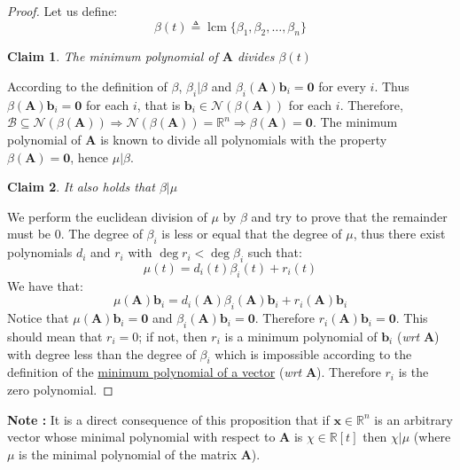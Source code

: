 \documentclass[a4paper,10pt,oneside]{book}
\newtheorem{claim}{Claim}
\begin{document}
\begin{proof}
 Let us define:
 \begin{equation}
  \beta(t)\triangleq\operatorname{lcm}\{\beta_1,\beta_2,\ldots,\beta_n\}
 \end{equation}
 \begin{claim}
  The minimum polynomial of $\mathbf{A}$ divides $\beta(t)$
 \end{claim}
 According to the definition of $\beta$, $\beta_i | \beta$ and $\beta_i(\mathbf{A})\mathbf{b}_i=\mathbf{0}$ for every $i$. Thus $\beta(\mathbf{A})\mathbf{b}_i=\mathbf{0}$ for each $i$, that is $\mathbf{b}_i\in\mathcal{N}(\beta(\mathbf{A}))$ for each $i$. Therefore, $\mathcal{B}\subseteq \mathcal{N}(\beta(\mathbf{A}))\Rightarrow\mathcal{N}(\beta(\mathbf{A}))=\mathbb{R}^n\Rightarrow\beta(\mathbf{A})=\mathbf{0}$. The minimum polynomial of $\mathbf{A}$ is known to divide all polynomials with the property $\beta(\mathbf{A})=\mathbf{0}$, hence $\mu|\beta$.
 \begin{claim}\label{claim:betaDividesMu}
  It also holds that $\beta|\mu$
 \end{claim}
 We perform the euclidean division of $\mu$ by $\beta$ and try to prove that the remainder must be 0. The degree of $\beta_i$ is less or equal that the degree of $\mu$, thus there exist polynomials $d_i$ and $r_i$ with $\operatorname{deg}r_i<\operatorname{deg}\beta_i$ such that:
 \begin{equation}
  \mu(t)=d_i(t)\beta_i(t)+r_i(t)
 \end{equation}
 We have that:
 \begin{equation}
  \mu(\mathbf{A})\mathbf{b}_i=d_i(\mathbf{A})\beta_i(\mathbf{A})\mathbf{b}_i+r_i(\mathbf{A})\mathbf{b}_i
 \end{equation}
 Notice that $\mu(\mathbf{A})\mathbf{b}_i=\mathbf{0}$ and $\beta_i(\mathbf{A})\mathbf{b}_i=\mathbf{0}$. Therefore $r_i(\mathbf{A})\mathbf{b}_i=\mathbf{0}$. This should mean that $r_i=0$; if not, then $r_i$ is a minimum polynomial of $\mathbf{b}_i$ (\textit{wrt} $\mathbf{A}$) with degree less than the degree of $\beta_i$ which is impossible according to the definition of the \hyperlink{def:mpOfVector}{minimum polynomial of a vector} (\textit{wrt} $\mathbf{A}$). Therefore $r_i$ is the zero polynomial.
\end{proof}
%
%
\noindent \textbf{Note :} It is a direct consequence of this proposition that if $\mathbf{x}\in\mathbb{R}^n$ is an arbitrary vector whose minimal polynomial with respect to $\mathbf{A}$ is $\chi\in\mathbb{R}[t]$ then $\chi|\mu$ (where $\mu$ is the minimal polynomial of the matrix $\mathbf{A}$).
\end{document}
